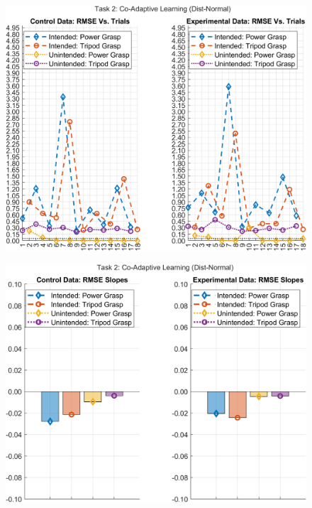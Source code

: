 \documentclass[12pt]{article}
\newcommand\figWidth{7in}
\begin{document}
\begin{figure}
    \includegraphics[width = \figWidth]{t2-rmse-dnorm.png}
\end{figure}
\begin{figure}
    \includegraphics[width = \figWidth]{t2-bar-dnorm.png}
\end{figure}
\end{document}

